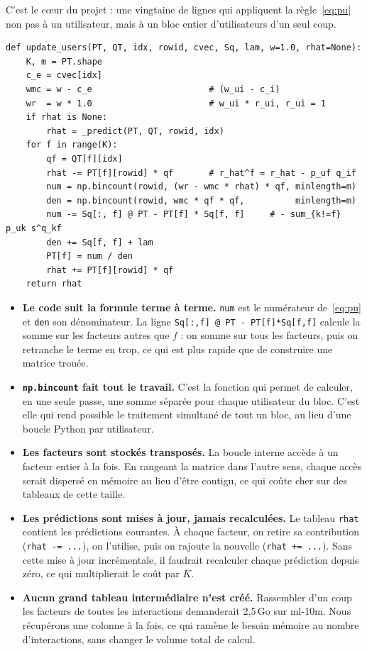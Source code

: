 \documentclass[11pt,a4paper]{article}
\begin{document}
C'est le cœur du projet : une vingtaine de lignes qui appliquent la règle~\eqref{eq:pu}
non pas à un utilisateur, mais à un bloc entier d'utilisateurs d'un seul coup.

\begin{lstlisting}[caption={\texttt{eals\_local.update\_users} - Éq.~\eqref{eq:pu},
vectorisée sur les utilisateurs d'un bloc.},label={lst:kernel}]
def update_users(PT, QT, idx, rowid, cvec, Sq, lam, w=1.0, rhat=None):
    K, m = PT.shape
    c_e = cvec[idx]
    wmc = w - c_e                       # (w_ui - c_i)
    wr  = w * 1.0                       # w_ui * r_ui, r_ui = 1
    if rhat is None:
        rhat = _predict(PT, QT, rowid, idx)
    for f in range(K):
        qf = QT[f][idx]
        rhat -= PT[f][rowid] * qf       # r_hat^f = r_hat - p_uf q_if
        num = np.bincount(rowid, (wr - wmc * rhat) * qf, minlength=m)
        den = np.bincount(rowid, wmc * qf * qf,          minlength=m)
        num -= Sq[:, f] @ PT - PT[f] * Sq[f, f]     # - sum_{k!=f} p_uk s^q_kf
        den += Sq[f, f] + lam
        PT[f] = num / den
        rhat += PT[f][rowid] * qf
    return rhat
\end{lstlisting}

\begin{itemize}\itemsep3pt
\item \textbf{Le code suit la formule terme à terme.} \texttt{num} est le numérateur
de~\eqref{eq:pu} et \texttt{den} son dénominateur. La ligne
\texttt{Sq[:,f] @ PT - PT[f]*Sq[f,f]} calcule la somme sur les facteurs autres que $f$ :
on somme sur tous les facteurs, puis on retranche le terme en trop, ce qui est plus
rapide que de construire une matrice trouée.
\item \textbf{\texttt{np.bincount} fait tout le travail.} C'est la fonction qui permet
de calculer, en une seule passe, une somme séparée pour chaque utilisateur du bloc.
C'est elle qui rend possible le traitement simultané de tout un bloc, au lieu d'une
boucle Python par utilisateur.
\item \textbf{Les facteurs sont stockés transposés.} La boucle interne accède à un
facteur entier à la fois. En rangeant la matrice dans l'autre sens, chaque accès serait
dispersé en mémoire au lieu d'être contigu, ce qui coûte cher sur des tableaux de cette
taille.
\item \textbf{Les prédictions sont mises à jour, jamais recalculées.} Le tableau
\texttt{rhat} contient les prédictions courantes. À chaque facteur, on retire sa
contribution (\texttt{rhat -= ...}), on l'utilise, puis on rajoute la nouvelle
(\texttt{rhat += ...}). Sans cette mise à jour incrémentale, il faudrait recalculer
chaque prédiction depuis zéro, ce qui multiplierait le coût par $K$.
\item \textbf{Aucun grand tableau intermédiaire n'est créé.} Rassembler d'un coup les
facteurs de toutes les interactions demanderait 2,5\,Go sur ml-10m. Nous récupérons une
colonne à la fois, ce qui ramène le besoin mémoire au nombre d'interactions, sans
changer le volume total de calcul.
\end{itemize}
\end{document}
